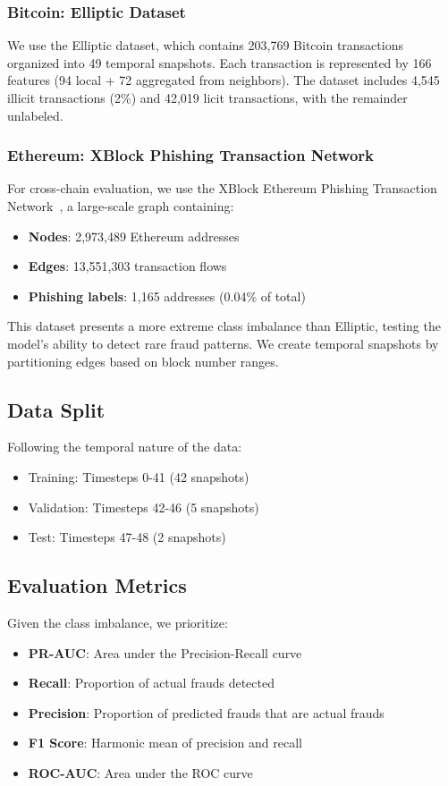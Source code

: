 \documentclass[12pt,a4paper]{article}
\begin{document}
\subsubsection{Bitcoin: Elliptic Dataset}
We use the Elliptic dataset, which contains 203,769 Bitcoin transactions organized into 49 temporal snapshots. Each transaction is represented by 166 features (94 local + 72 aggregated from neighbors). The dataset includes 4,545 illicit transactions (2\%) and 42,019 licit transactions, with the remainder unlabeled.

\subsubsection{Ethereum: XBlock Phishing Transaction Network}
For cross-chain evaluation, we use the XBlock Ethereum Phishing Transaction Network~\citep{xblock2023}, a large-scale graph containing:
\begin{itemize}
    \item \textbf{Nodes}: 2,973,489 Ethereum addresses
    \item \textbf{Edges}: 13,551,303 transaction flows
    \item \textbf{Phishing labels}: 1,165 addresses (0.04\% of total)
\end{itemize}
This dataset presents a more extreme class imbalance than Elliptic, testing the model's ability to detect rare fraud patterns. We create temporal snapshots by partitioning edges based on block number ranges.

\subsection{Data Split}
Following the temporal nature of the data:
\begin{itemize}
    \item Training: Timesteps 0-41 (42 snapshots)
    \item Validation: Timesteps 42-46 (5 snapshots)
    \item Test: Timesteps 47-48 (2 snapshots)
\end{itemize}

\subsection{Evaluation Metrics}
Given the class imbalance, we prioritize:
\begin{itemize}
    \item \textbf{PR-AUC}: Area under the Precision-Recall curve
    \item \textbf{Recall}: Proportion of actual frauds detected
    \item \textbf{Precision}: Proportion of predicted frauds that are actual frauds
    \item \textbf{F1 Score}: Harmonic mean of precision and recall
    \item \textbf{ROC-AUC}: Area under the ROC curve
\end{itemize}
\end{document}
